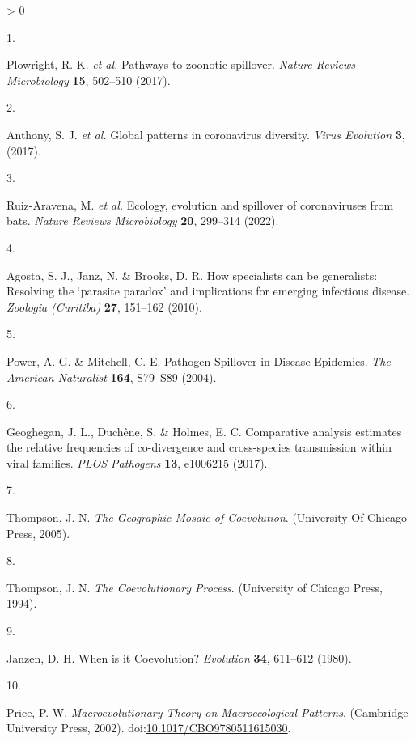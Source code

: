 \documentclass[10pt,oneside]{article}
\newlength{\cslhangindent}
\newlength{\csllabelwidth}
\newenvironment{CSLReferences}[3] %
 {%
  \setlength{\parindent}{0pt}
  \ifodd #1 \everypar{\setlength{\hangindent}{\cslhangindent}}\ignorespaces\fi
  \ifnum #2 > 0
  \setlength{\parskip}{#2\baselineskip}
  \fi
 }%
 {}
\newcommand{\CSLLeftMargin}[1]{\parbox[t]{\maxof{\widthof{#1}}{\csllabelwidth}}{#1}}
\newcommand{\CSLRightInline}[1]{\parbox[t]{\linewidth}{#1}}
\begin{document}
\hypertarget{refs}{}
\begin{CSLReferences}{0}{0}
\leavevmode\hypertarget{ref-Plowright2017PatZoo}{}%
\CSLLeftMargin{1. }
\CSLRightInline{Plowright, R. K. \emph{et al.} Pathways to zoonotic
spillover. \emph{Nature Reviews Microbiology} \textbf{15}, 502--510
(2017).}

\leavevmode\hypertarget{ref-Anthony2017GloPat}{}%
\CSLLeftMargin{2. }
\CSLRightInline{Anthony, S. J. \emph{et al.} Global patterns in
coronavirus diversity. \emph{Virus Evolution} \textbf{3}, (2017).}

\leavevmode\hypertarget{ref-Ruiz-Aravena2022EcoEvo}{}%
\CSLLeftMargin{3. }
\CSLRightInline{Ruiz-Aravena, M. \emph{et al.} Ecology, evolution and
spillover of coronaviruses from bats. \emph{Nature Reviews Microbiology}
\textbf{20}, 299--314 (2022).}

\leavevmode\hypertarget{ref-Agosta2010HowSpe}{}%
\CSLLeftMargin{4. }
\CSLRightInline{Agosta, S. J., Janz, N. \& Brooks, D. R. How specialists
can be generalists: Resolving the {`parasite paradox'} and implications
for emerging infectious disease. \emph{Zoologia (Curitiba)} \textbf{27},
151--162 (2010).}

\leavevmode\hypertarget{ref-Power2004PatSpi}{}%
\CSLLeftMargin{5. }
\CSLRightInline{Power, A. G. \& Mitchell, C. E. Pathogen Spillover in
Disease Epidemics. \emph{The American Naturalist} \textbf{164}, S79--S89
(2004).}

\leavevmode\hypertarget{ref-Geoghegan2017ComAna}{}%
\CSLLeftMargin{6. }
\CSLRightInline{Geoghegan, J. L., Duchêne, S. \& Holmes, E. C.
Comparative analysis estimates the relative frequencies of co-divergence
and cross-species transmission within viral families. \emph{PLOS
Pathogens} \textbf{13}, e1006215 (2017).}

\leavevmode\hypertarget{ref-Thompson2005GeoMos}{}%
\CSLLeftMargin{7. }
\CSLRightInline{Thompson, J. N. \emph{The Geographic Mosaic of
Coevolution}. (University Of Chicago Press, 2005).}

\leavevmode\hypertarget{ref-Thompson1994CoePro}{}%
\CSLLeftMargin{8. }
\CSLRightInline{Thompson, J. N. \emph{The Coevolutionary Process}.
(University of Chicago Press, 1994).}

\leavevmode\hypertarget{ref-Janzen1980WheIt}{}%
\CSLLeftMargin{9. }
\CSLRightInline{Janzen, D. H. When is it Coevolution? \emph{Evolution}
\textbf{34}, 611--612 (1980).}

\leavevmode\hypertarget{ref-Price2002MacThe}{}%
\CSLLeftMargin{10. }
\CSLRightInline{Price, P. W. \emph{Macroevolutionary Theory on
Macroecological Patterns}. (Cambridge University Press, 2002).
doi:\href{https://doi.org/10.1017/CBO9780511615030}{10.1017/CBO9780511615030}.}


\end{CSLReferences}
\end{document}
